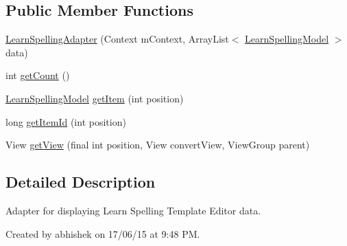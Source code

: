 \subsection*{Public Member Functions}
\begin{DoxyCompactItemize}
\item 
\hyperlink{classorg_1_1buildmlearn_1_1toolkit_1_1templates_1_1LearnSpellingAdapter_a7d6a79b3c3da83e213a1a606fca26083}{Learn\-Spelling\-Adapter} (Context m\-Context, Array\-List$<$ \hyperlink{classorg_1_1buildmlearn_1_1toolkit_1_1templates_1_1LearnSpellingModel}{Learn\-Spelling\-Model} $>$ data)
\item 
int \hyperlink{classorg_1_1buildmlearn_1_1toolkit_1_1templates_1_1LearnSpellingAdapter_aa03e460bd84bbd1fb5d4ac881e859256}{get\-Count} ()
\item 
\hyperlink{classorg_1_1buildmlearn_1_1toolkit_1_1templates_1_1LearnSpellingModel}{Learn\-Spelling\-Model} \hyperlink{classorg_1_1buildmlearn_1_1toolkit_1_1templates_1_1LearnSpellingAdapter_af0b0934c215c709326ded3e7fc3b56aa}{get\-Item} (int position)
\item 
long \hyperlink{classorg_1_1buildmlearn_1_1toolkit_1_1templates_1_1LearnSpellingAdapter_a6fb76396d65194c3e447ec6883124564}{get\-Item\-Id} (int position)
\item 
View \hyperlink{classorg_1_1buildmlearn_1_1toolkit_1_1templates_1_1LearnSpellingAdapter_abdf6a7e409727aff2ac23c6b1993ee04}{get\-View} (final int position, View convert\-View, View\-Group parent)
\end{DoxyCompactItemize}


\subsection{Detailed Description}
Adapter for displaying Learn Spelling Template Editor data. 

Created by abhishek on 17/06/15 at 9\-:48 P\-M. 

